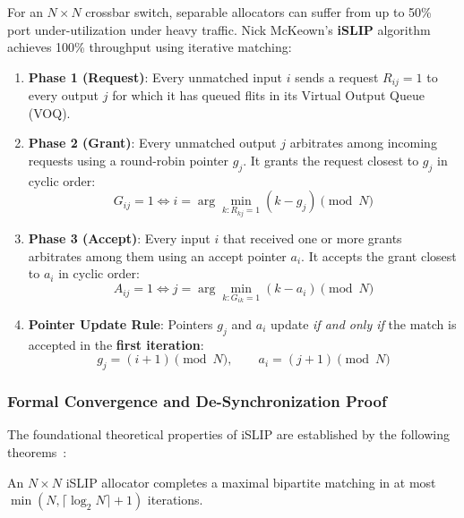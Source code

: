 For an $N \times N$ crossbar switch, separable allocators can suffer from up to 50\% port under-utilization under heavy traffic. Nick McKeown's \textbf{iSLIP} algorithm~\cite{McKeown1999} achieves 100\% throughput using iterative matching:
\begin{enumerate}
    \item \textbf{Phase 1 (Request)}: Every unmatched input $i$ sends a request $R_{ij} = 1$ to every output $j$ for which it has queued flits in its Virtual Output Queue (VOQ).
    \item \textbf{Phase 2 (Grant)}: Every unmatched output $j$ arbitrates among incoming requests using a round-robin pointer $g_j$. It grants the request closest to $g_j$ in cyclic order:
    \begin{equation}
    G_{ij} = 1 \iff i = \arg\min_{k: R_{kj}=1} (k - g_j) \pmod N
    \end{equation}
    \item \textbf{Phase 3 (Accept)}: Every input $i$ that received one or more grants arbitrates among them using an accept pointer $a_i$. It accepts the grant closest to $a_i$ in cyclic order:
    \begin{equation}
    A_{ij} = 1 \iff j = \arg\min_{k: G_{ik}=1} (k - a_i) \pmod N
    \end{equation}
    \item \textbf{Pointer Update Rule}: Pointers $g_j$ and $a_i$ update \emph{if and only if} the match is accepted in the \textbf{first iteration}:
    \begin{equation}
    g_j = (i + 1) \pmod N, \qquad a_i = (j + 1) \pmod N
    \label{eq:islip_pointers}
    \end{equation}
\end{enumerate}

\subsubsection{Formal Convergence and De-Synchronization Proof}
The foundational theoretical properties of iSLIP are established by the following theorems~\cite{McKeown1999}:

\begin{theorem}
An $N \times N$ iSLIP allocator completes a maximal bipartite matching in at most $\min(N, \lceil \log_2 N \rceil + 1)$ iterations.
\end{theorem}

